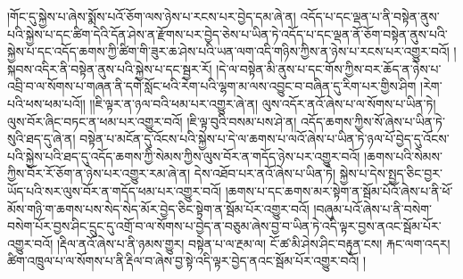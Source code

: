 །གོང་དུ་སྐྱེས་པ་ཞེས་སྨོས་པའོ་ཅོག་ལས་ཉེས་པ་རངས་པར་བྱེད་དམ་ཞེ་ན། འདོད་པ་དང་ལྡན་པ་ནི་བསྟེན་ནུས་པའི་སྐྱེས་པ་དང་ཚིག་དེའི་དོན་ཤེས་ན་རྫོགས་པར་བྱེད་ཅེས་པ་ཡིན་ཏེ་འདོད་པ་དང་ལྡན་ནོ་ཅོག་བསྟེན་ནུས་པའི་སྐྱེས་པ་དང་འདོད་ཆགས་ཀྱི་ཚིག་གི་ཟུར་ཆ་ཤེས་པའི་ཡན་ལག་འདི་གཉིས་ཀྱིས་ན་ཉེས་པ་རངས་པར་འགྱུར་བའོ། །སྐབས་འདིར་ནི་བསྟེན་ནུས་པའི་སྐྱེས་པ་དང་སྦྱར་རོ། །དེ་ལ་བསྟེན་མི་ནུས་པ་དང་གོས་ཀྱིས་བར་ཆོད་ན་ཉེས་པ་འབྲི་བ་ལ་སོགས་པ་གཞན་ནི་དགེ་སློང་ཕའི་རེག་པའི་ལྷག་མ་ལས་འབྱུང་བ་བཞིན་དུ་རིག་པར་གྱིས་ཤིག །རེག་པའི་ཕས་ཕམ་པའོ།། །།ཇི་ལྟར་ན་ཉལ་བའི་ཕམ་པར་འགྱུར་ཞེ་ན། ལུས་འདོར་ནའོ་ཞེས་པ་ལ་སོགས་པ་ཡིན་ཏེ། ལུས་བོར་ཞིང་བཏང་ན་ཕམ་པར་འགྱུར་བའོ། །ཇི་ལྟ་བུའི་བསམ་པས་ཤེ་ན། འདོད་ཆགས་ཀྱིས་སོ་ཞེས་པ་ཡིན་ཏེ་སུའི་ཐད་དུ་ཞེ་ན། བསྟེན་པ་མངོན་དུ་འོངས་པའི་སྐྱེས་པ་དེ་ལ་ཆགས་པ་ལའོ་ཞེས་པ་ཡིན་ཏེ་ཉལ་པོ་བྱེད་དུ་འོངས་པའི་སྐྱེས་པའི་ཐད་དུ་འདོད་ཆགས་ཀྱི་སེམས་ཀྱིས་ལུས་བོར་ན་གདོད་ཉེས་པར་འགྱུར་བའོ། །ཆགས་པའི་སེམས་ཀྱིས་བོར་རོ་ཅོག་ན་ཉེས་པར་འགྱུར་རམ་ཞེ་ན། དེས་འཐོབ་པར་ནའོ་ཞེས་པ་ཡིན་ཏེ། སྐྱེས་པ་དེས་སྤྱད་ཅིང་བྱར་ཡོད་པའི་སར་ལུས་བོར་ན་གདོད་ཕམ་པར་འགྱུར་བའོ། །ཆགས་པ་དང་ཆགས་མར་སྟེག་ན་སྦོམ་པོའོ་ཞེས་པ་ནི་ཕོ་མོས་གཉི་ག་ཆགས་པས་སེད་སེད་མོར་བྱེད་ཅིང་སྟེག་ན་སྦོམ་པོར་འགྱུར་བའོ། །བཞུམ་པའོ་ཞེས་པ་ནི་བསེག་བསེག་པོར་བྱས་ཤིང་དྲུང་དུ་འགྲོ་བ་ལ་སོགས་པ་བྱེད་ན་བཅུམ་ཞེས་བྱ་བ་ཡིན་ཏེ་འདི་ལྟར་བྱས་ནའང་སྦོམ་པོར་འགྱུར་བའོ། །རྡིལ་ནའོ་ཞེས་པ་ནི་ཉམས་གྱུར། བསྟེན་པ་ལ་རྔམ་ལ། ངོ་ཚ་མི་ཤེས་ཤིང་བརྟུན་ངས། རྐང་ལག་འདར། ཚིག་འཁྲུལ་པ་ལ་སོགས་པ་ནི་རྡིལ་བ་ཞེས་བྱ་སྟེ་འདི་ལྟར་བྱེད་ནའང་སྦོམ་པོར་འགྱུར་བའོ། །
